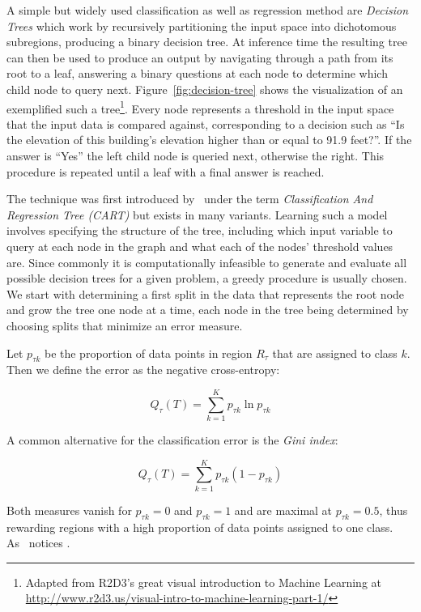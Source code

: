 A simple but widely used classification as well as regression method are \emph{Decision Trees} which work by recursively partitioning the input space into dichotomous subregions, producing a binary decision tree. At inference time the resulting tree can then be used to produce an output by navigating through a path from its root to a leaf, answering a binary questions at each node to determine which child node to query next. Figure~\ref{fig:decision-tree} shows the visualization of an exemplified such a tree\footnote{Adapted from R2D3's great visual introduction to Machine Learning at \url{http://www.r2d3.us/visual-intro-to-machine-learning-part-1/}}.
Every node represents a threshold in the input space that  the input data is compared against, corresponding to a decision such as ``Is the elevation of this building's elevation higher than or equal to 91.9 feet?''. If the answer is ``Yes'' the left child node is queried next, otherwise the right. This procedure is repeated until a leaf with a final answer is reached.

The technique was first introduced by~\cite{Breiman:1984ab} under the term \emph{Classification And Regression Tree (CART)} but exists in many variants. Learning such a model involves specifying the structure of the tree, including which input variable to query at each node in the graph and what each of the nodes' threshold values are. Since commonly it is computationally infeasible to generate and evaluate all possible decision trees for a given problem, a greedy procedure is usually chosen. We start with determining a first split in the data that represents the root node and grow the tree one node at a time, each node in the tree being determined by choosing splits that minimize an error measure.

Let $p_{\tau k}$ be the proportion of data points in region $R_{\tau}$ that are assigned to class $k$. Then we define the error as the negative cross-entropy:

\begin{equation}
  Q_{\tau}(T) = \sum_{k=1}^K p_{\tau k} \ln p_{\tau k}
\end{equation}

A common alternative for the classification error is the \emph{Gini index}:

\begin{equation}
  Q_{\tau}(T) = \sum_{k=1}^K p_{\tau k} (1 - p_{\tau k})
\end{equation}

Both measures vanish for $p_{\tau k} = 0$ and $p_{\tau k} = 1$ and are maximal at $p_{\tau k} = 0.5$, thus rewarding regions with a high proportion of data points assigned to one class. As~\cite[Chapter 14.4, p.~664]{Bishop:2006aa} notices .

